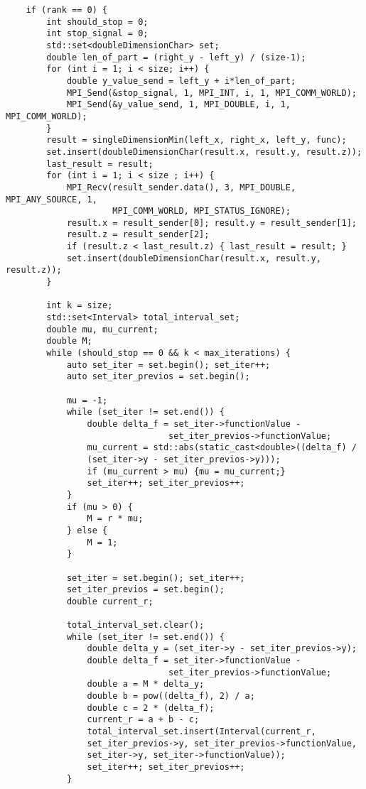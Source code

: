 \documentclass{report}
\begin{document}
\begin{lstlisting}
    if (rank == 0) {
        int should_stop = 0;
        int stop_signal = 0;
        std::set<doubleDimensionChar> set;
        double len_of_part = (right_y - left_y) / (size-1);
        for (int i = 1; i < size; i++) {
            double y_value_send = left_y + i*len_of_part;
            MPI_Send(&stop_signal, 1, MPI_INT, i, 1, MPI_COMM_WORLD);
            MPI_Send(&y_value_send, 1, MPI_DOUBLE, i, 1, MPI_COMM_WORLD);
        }
        result = singleDimensionMin(left_x, right_x, left_y, func);
        set.insert(doubleDimensionChar(result.x, result.y, result.z));
        last_result = result;
        for (int i = 1; i < size ; i++) {
            MPI_Recv(result_sender.data(), 3, MPI_DOUBLE, MPI_ANY_SOURCE, 1,
                     MPI_COMM_WORLD, MPI_STATUS_IGNORE);
            result.x = result_sender[0]; result.y = result_sender[1];
            result.z = result_sender[2];
            if (result.z < last_result.z) { last_result = result; }
            set.insert(doubleDimensionChar(result.x, result.y, result.z));
        }

        int k = size;
        std::set<Interval> total_interval_set;
        double mu, mu_current;
        double M;
        while (should_stop == 0 && k < max_iterations) {
            auto set_iter = set.begin(); set_iter++;
            auto set_iter_previos = set.begin();

            mu = -1;
            while (set_iter != set.end()) {
                double delta_f = set_iter->functionValue -
                                set_iter_previos->functionValue;
                mu_current = std::abs(static_cast<double>((delta_f) /
                (set_iter->y - set_iter_previos->y)));
                if (mu_current > mu) {mu = mu_current;}
                set_iter++; set_iter_previos++;
            }
            if (mu > 0) {
                M = r * mu;
            } else {
                M = 1;
            }

            set_iter = set.begin(); set_iter++;
            set_iter_previos = set.begin();
            double current_r;

            total_interval_set.clear();
            while (set_iter != set.end()) {
                double delta_y = (set_iter->y - set_iter_previos->y);
                double delta_f = set_iter->functionValue -
                                set_iter_previos->functionValue;
                double a = M * delta_y;
                double b = pow((delta_f), 2) / a;
                double c = 2 * (delta_f);
                current_r = a + b - c;
                total_interval_set.insert(Interval(current_r,
                set_iter_previos->y, set_iter_previos->functionValue,
                set_iter->y, set_iter->functionValue));
                set_iter++; set_iter_previos++;
            }


\end{lstlisting}
\end{document}
